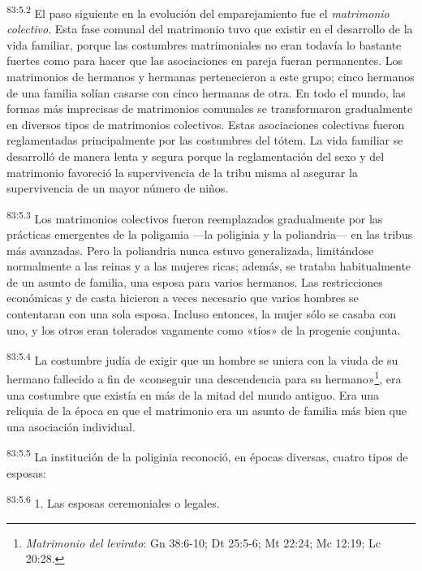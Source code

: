\par
\textsuperscript{83:5.2} El paso siguiente en la evolución del emparejamiento fue el \textit{matrimonio colectivo}. Esta fase comunal del matrimonio tuvo que existir en el desarrollo de la vida familiar, porque las costumbres matrimoniales no eran todavía lo bastante fuertes como para hacer que las asociaciones en pareja fueran permanentes. Los matrimonios de hermanos y hermanas pertenecieron a este grupo; cinco hermanos de una familia solían casarse con cinco hermanas de otra. En todo el mundo, las formas más imprecisas de matrimonios comunales se transformaron gradualmente en diversos tipos de matrimonios colectivos. Estas asociaciones colectivas fueron reglamentadas principalmente por las costumbres del tótem. La vida familiar se desarrolló de manera lenta y segura porque la reglamentación del sexo y del matrimonio favoreció la supervivencia de la tribu misma al asegurar la supervivencia de un mayor número de niños.

\par
\textsuperscript{83:5.3} Los matrimonios colectivos fueron reemplazados gradualmente por las prácticas emergentes de la poligamia ---la poliginia y la poliandria--- en las tribus más avanzadas. Pero la poliandria nunca estuvo generalizada, limitándose normalmente a las reinas y a las mujeres ricas; además, se trataba habitualmente de un asunto de familia, una esposa para varios hermanos. Las restricciones económicas y de casta hicieron a veces necesario que varios hombres se contentaran con una sola esposa. Incluso entonces, la mujer sólo se casaba con uno, y los otros eran tolerados vagamente como «tíos» de la progenie conjunta.

\par
\textsuperscript{83:5.4} La costumbre judía de exigir que un hombre se uniera con la viuda de su hermano fallecido a fin de «conseguir una descendencia para su hermano»\footnote{\textit{Matrimonio del levirato}: Gn 38:6-10; Dt 25:5-6; Mt 22:24; Mc 12:19; Lc 20:28.}, era una costumbre que existía en más de la mitad del mundo antiguo. Era una reliquia de la época en que el matrimonio era un asunto de familia más bien que una asociación individual.

\par
\textsuperscript{83:5.5} La institución de la poliginia reconoció, en épocas diversas, cuatro tipos de esposas:

\par
\textsuperscript{83:5.6} 1. Las esposas ceremoniales o legales.

